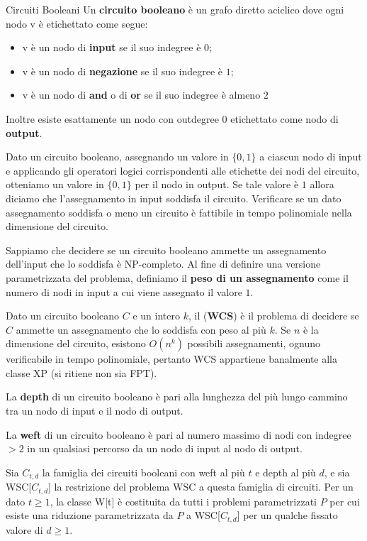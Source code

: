 \documentclass[10pt,a4paper]{article}
\begin{document}
\begin{multicols}{3}
\begin{textbox}{Circuiti Booleani}
Un \textbf{circuito booleano} è un grafo diretto aciclico dove ogni nodo v
è etichettato come segue:
\begin{itemize}[leftmargin=*]
    \item v è un nodo di \textbf{input} se il suo indegree è \(0\);
    \item v è un nodo di \textbf{negazione} se il suo indegree è \(1\);
    \item v è un nodo di \textbf{and} o di \textbf{or} se il suo indegree è almeno \(2\)
\end{itemize}
Inoltre esiste esattamente un nodo con outdegree \(0\) etichettato
come nodo di \textbf{output}.

Dato un circuito booleano, assegnando un valore in \(\{0,1\}\) a
ciascun nodo di input e applicando gli operatori logici
corrispondenti alle etichette dei nodi del circuito, otteniamo un
valore in \(\{0,1\}\) per il nodo in output.
Se tale valore è \(1\) allora diciamo che l’assegnamento in input
soddisfa il circuito.
Verificare se un dato assegnamento soddisfa o meno un
circuito è fattibile in tempo polinomiale nella dimensione del
circuito.

Sappiamo che decidere se un circuito booleano ammette un
assegnamento dell’input che lo soddisfa è
NP-completo.
Al fine di definire una versione parametrizzata del problema,
definiamo il \textbf{peso di un assegnamento} come il numero di nodi
in input a cui viene assegnato il valore \(1\).

Dato un circuito booleano \(C\) e un intero \(k\), il 
(\textbf{WCS}) è il problema di decidere se \(C\) ammette un
assegnamento che lo soddisfa con peso al più \(k\).
Se \(n\) è la dimensione del circuito, esistono \(O(n^k)\) possibili
assegnamenti, ognuno verificabile in tempo polinomiale,
pertanto WCS appartiene banalmente alla classe XP (si ritiene non sia FPT).

La \textbf{depth} di un circuito booleano è pari alla lunghezza
del più lungo cammino tra un nodo di input e il nodo di output.

La \textbf{weft} di un circuito booleano è pari al numero massimo
di nodi con indegree \( > 2\) in un qualsiasi percorso da un
nodo di input al nodo di output.

Sia \(C_{t,d}\) la famiglia dei circuiti booleani con weft al più \(t\) e depth al
più \(d\), e sia WSC[\(C_{t,d}\)] la restrizione del problema WSC a questa
famiglia di circuiti.
Per un dato \(t \geq 1\), la classe W[t] è costituita da tutti i problemi
parametrizzati \(P\) per cui esiste una riduzione parametrizzata da \(P\) 
a WSC[\(C_{t,d}\)] per un qualche fissato valore di \(d \geq 1\).
\end{textbox}


\end{multicols}
\end{document}
